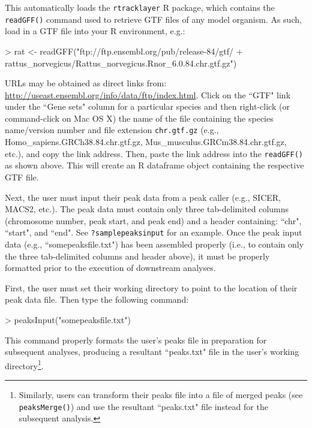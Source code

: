 \documentclass[12pt]{article}
\begin{document}
This automatically loads the \texttt{rtracklayer} R package, which contains the \texttt{readGFF()} command used to retrieve GTF files of any model organism.  As such, load in a GTF file into your R environment, e.g.:

\begin{Schunk}
\begin{Sinput}
> rat <- readGFF("ftp://ftp.ensembl.org/pub/release-84/gtf/
+                       rattus_norvegicus/Rattus_norvegicus.Rnor_6.0.84.chr.gtf.gz")
\end{Sinput}
\end{Schunk}

URLs may be obtained as direct links from: \url{http://useast.ensembl.org/info/data/ftp/index.html}.  Click on the ``GTF" link under the ``Gene sets" column for a particular species and then right-click (or command-click on Mac OS X) the name of the file containing the species name/version number and file extension \texttt{chr.gtf.gz} (e.g., Homo\_sapiens.GRCh38.84.chr.gtf.gz, Mus\_musculus.GRCm38.84.chr.gtf.gz, etc.), and copy the link address.  Then, paste the link address into the \texttt{readGFF()} as shown above.  This will create an R dataframe object containing the respective GTF file.

Next, the user must input their peak data from a peak caller (e.g., SICER, MACS2, etc.).  The peak data must contain only three tab-delimited columns (chromosome number, peak start, and peak end) and a header containing: ``chr", ``start", and ``end".  See \texttt{?samplepeaksinput} for an example.  Once the peak input data (e.g., ``somepeaksfile.txt") has been assembled properly (i.e., to contain only the three tab-delimited columns and header above), it must be properly formatted prior to the execution of downstream analyses.  

First, the user must set their working directory to point to the location of their peak data file.  Then type the following command:

\begin{Schunk}
\begin{Sinput}
> peaksInput("somepeaksfile.txt")
\end{Sinput}
\end{Schunk}

This command properly formats the user's peaks file in preparation for subsequent analyses, producing a resultant ``peaks.txt" file in the user's working directory\footnote{Similarly, users can transform their peaks file into a file of merged peaks (see \texttt{peaksMerge()}) and use the resultant ``peaks.txt" file instead for the subsequent analysis.}.
\end{document}
